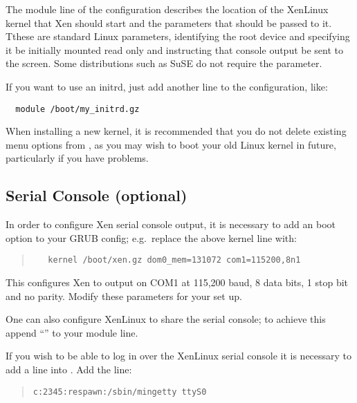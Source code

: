 The module line of the configuration describes the location of the
XenLinux kernel that Xen should start and the parameters that should
be passed to it. Tthese are standard Linux parameters, identifying the
root device and specifying it be initially mounted read only and
instructing that console output be sent to the screen. Some
distributions such as SuSE do not require the  parameter.



If you want to use an initrd, just add another  line to
the configuration, like:
{\small
\begin{verbatim}
  module /boot/my_initrd.gz
\end{verbatim}
}

When installing a new kernel, it is recommended that you do not delete
existing menu options from , as you may wish to boot
your old Linux kernel in future, particularly if you have problems.

\subsection{Serial Console (optional)}


In order to configure Xen serial console output, it is necessary to
add an boot option to your GRUB config; e.g.\ replace the above kernel
line with:
\begin{quote}
{\small
\begin{verbatim}
   kernel /boot/xen.gz dom0_mem=131072 com1=115200,8n1
\end{verbatim}}
\end{quote}

This configures Xen to output on COM1 at 115,200 baud, 8 data bits, 1
stop bit and no parity. Modify these parameters for your set up.

One can also configure XenLinux to share the serial console; to
achieve this append ``'' to your module line.

If you wish to be able to log in over the XenLinux serial console it
is necessary to add a line into . Add the line:
\begin{quote} {\small {\tt c:2345:respawn:/sbin/mingetty ttyS0}}
\end{quote}

